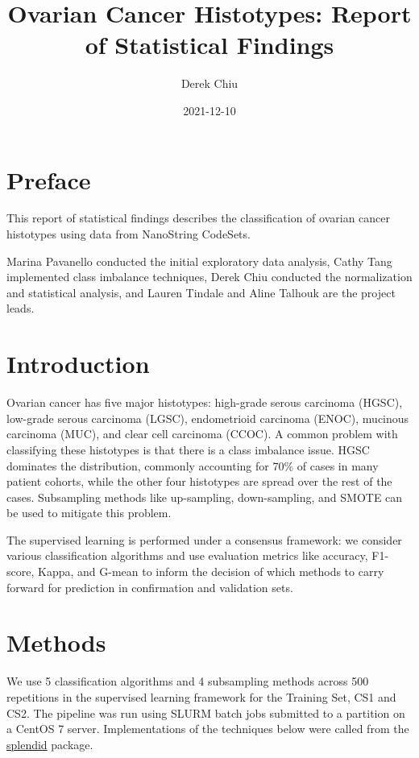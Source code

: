 \documentclass[
]{report}
\title{Ovarian Cancer Histotypes: Report of Statistical Findings}
\author{Derek Chiu}
\date{2021-12-10}
\begin{document}
\maketitle

{
\hypersetup{linkcolor=}
\setcounter{tocdepth}{1}
\tableofcontents
}
\listoffigures
\listoftables
\hypertarget{preface}{%
\chapter*{Preface}\label{preface}}

This report of statistical findings describes the classification of ovarian cancer histotypes using data from NanoString CodeSets.

Marina Pavanello conducted the initial exploratory data analysis, Cathy Tang implemented class imbalance techniques, Derek Chiu conducted the normalization and statistical analysis, and Lauren Tindale and Aline Talhouk are the project leads.

\hypertarget{introduction}{%
\chapter{Introduction}\label{introduction}}

Ovarian cancer has five major histotypes: high-grade serous carcinoma (HGSC), low-grade serous carcinoma (LGSC), endometrioid carcinoma (ENOC), mucinous carcinoma (MUC), and clear cell carcinoma (CCOC). A common problem with classifying these histotypes is that there is a class imbalance issue. HGSC dominates the distribution, commonly accounting for 70\% of cases in many patient cohorts, while the other four histotypes are spread over the rest of the cases. Subsampling methods like up-sampling, down-sampling, and SMOTE can be used to mitigate this problem.

The supervised learning is performed under a consensus framework: we consider various classification algorithms and use evaluation metrics like accuracy, F1-score, Kappa, and G-mean to inform the decision of which methods to carry forward for prediction in confirmation and validation sets.

\hypertarget{methods}{%
\chapter{Methods}\label{methods}}

We use 5 classification algorithms and 4 subsampling methods across 500 repetitions in the supervised learning framework for the Training Set, CS1 and CS2. The pipeline was run using SLURM batch jobs submitted to a partition on a CentOS 7 server. Implementations of the techniques below were called from the \href{https://alinetalhouk.github.io/splendid/}{splendid} package.
\end{document}
